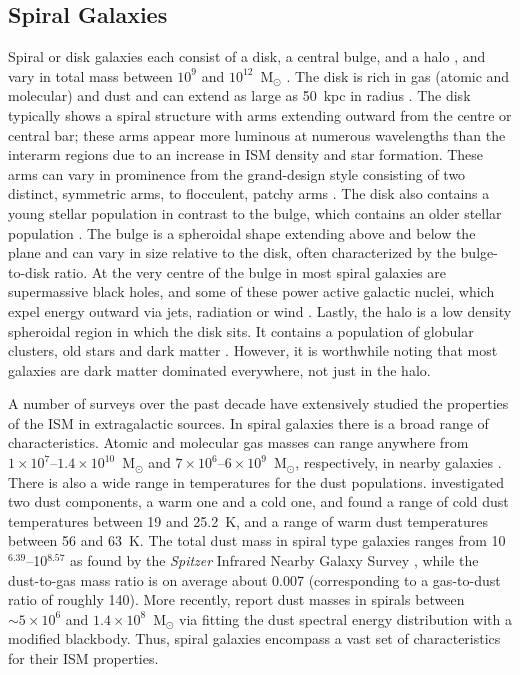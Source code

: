 \subsection{Spiral Galaxies}\label{spirals}
Spiral or disk galaxies each consist of a disk, a central bulge, and a halo \citep{1998gaas.book.....B}, and vary in total mass between $10^{9}$ and $10^{12}$~M$_{\odot}$ \citep{carrol_ostlie}.  The disk is rich in gas (atomic and molecular) and dust and can extend as large as 50~kpc in radius \citep{carrol_ostlie}. The disk typically shows a spiral structure with arms extending outward from the centre or central bar; these arms appear more luminous at numerous wavelengths than the interarm regions due to an increase in ISM density and star formation.  These arms can vary in prominence from the grand-design style consisting of two distinct, symmetric arms, to flocculent, patchy arms \citep[e.g.][]{1926ApJ....64..321H,1982MNRAS.201.1021E,1987ApJ...314....3E,1998gaas.book.....B}.  The disk also contains a young stellar population in contrast to the bulge, which contains an older stellar population \citep[e.g.][]{1944ApJ...100..147B}.  The bulge is a spheroidal shape extending above and below the plane and can vary in size relative to the disk, often characterized by the bulge-to-disk ratio.   At the very centre of the bulge in most spiral galaxies are supermassive black holes, and some of these power active galactic nuclei, which expel energy outward via jets, radiation or wind \citep{2012ARA&A..50..455F}.  Lastly, the halo is a low density spheroidal region in which the disk sits.  It contains a population of globular clusters, old stars and dark matter \citep{1987AJ.....93..816K,1998gaas.book.....B}.  However, it is worthwhile noting that most galaxies are dark matter dominated everywhere, not just in the halo.

A number of surveys over the past decade have extensively studied the properties of the ISM in extragalactic sources.  In spiral galaxies there is a broad range of characteristics.  Atomic and molecular gas masses can range anywhere from $1 \times 10^{7}$--$1.4 \times 10^{10}$~M$_{\odot}$ and $7 \times 10^{6}$--$6 \times 10^{9}$~M$_{\odot}$, respectively, in nearby galaxies \citep[e.g.][]{2008AJ....136.2563W,2009AJ....137.4670L}.  There is also a wide range in temperatures for the dust populations.  \citet{2012MNRAS.425..763G} investigated two dust components, a warm one and a cold one, and found a range of cold dust temperatures between 19 and 25.2~K, and a range of warm dust temperatures between 56 and 63~K.  The total dust mass in spiral type galaxies ranges from 10$^{6.39}$--10$^{8.57}$ as found by the \emph{Spitzer} Infrared Nearby Galaxy Survey \citep{2007ApJ...663..866D}, while the dust-to-gas mass ratio is on average about 0.007 (corresponding to a gas-to-dust ratio of roughly 140).  More recently, \citet{2012MNRAS.425..763G} report dust masses in spirals between $\sim 5 \times 10^{6}$ and $1.4 \times 10^{8}$~M$_{\odot}$ via fitting the dust spectral energy distribution with a modified blackbody.  Thus, spiral galaxies encompass a vast set of characteristics for their ISM properties.


